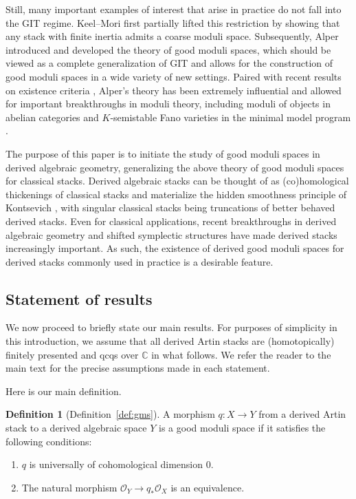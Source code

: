 \documentclass[a4paper,twoside,11pt]{amsart}
\theoremstyle{plain}
\theoremstyle{definition}
\newtheorem*{definition*}{Definition}
\theoremstyle{remark}
\numberwithin{equation}{section}
\newcommand{\CC}{\mathbb{C}} %
\newcommand{\oO}{\mathcal{O}}
\begin{document}
Still, many important examples of interest that arise in practice do not fall into the GIT regime. Keel--Mori \cite{KeelMori} first partially lifted this restriction by showing that any stack with finite inertia admits a coarse moduli space. Subsequently, Alper \cite{AlperGood} introduced and developed \cite{AlperFundLemma, AlperLocalProp} the theory of good moduli spaces, which should be viewed as a complete generalization of GIT and allows for the construction of good moduli spaces in a wide variety of new settings. Paired with recent results on existence criteria \cite{AlperExistence}, Alper's theory has been extremely influential and allowed for important breakthroughs in moduli theory, including moduli of objects in abelian categories \cite{AlperExistence} and $K$-semistable Fano varieties in the minimal model program \cite{GMSKStab}.
\smallskip

The purpose of this paper is to initiate the study of good moduli spaces in derived algebraic geometry, generalizing the above theory of good moduli spaces for classical stacks. Derived algebraic stacks \cite{HAG2DAG} can be thought of as (co)homological thickenings of classical stacks and materialize the hidden smoothness principle of Kontsevich \cite{Konts}, with singular classical stacks being truncations of better behaved derived stacks. Even for classical applications, recent breakthroughs in derived algebraic geometry \cite{ToenDerived} and shifted symplectic structures \cite{PTVV} have made derived stacks increasingly important. As such, the existence of derived good moduli spaces for derived stacks commonly used in practice is a desirable feature.

\subsection*{Statement of results} We now proceed to briefly state our main results. For purposes of simplicity in this introduction, we assume that all derived Artin stacks are (homotopically) finitely presented and qcqs over $\CC$ in what follows. We refer the reader to the main text for the precise assumptions made in each statement.

Here is our main definition.

\begin{definition*}[Definition~\ref{def:gms}]
    A morphism $q \colon X \to Y$ from a derived Artin stack to a derived algebraic space $Y$ is a good moduli space if it satisfies the following conditions:
    \begin{enumerate}
        \item $q$ is universally of cohomological dimension $0$.
        \item The natural morphism $\oO_Y \to q_\ast \oO_X$ is an equivalence.
    \end{enumerate}
\end{definition*}
\end{document}
